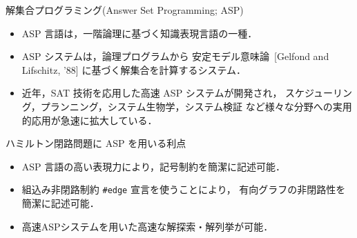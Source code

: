 \documentclass[dvipdfmx]{beamer}
\begin{document}
\begin{frame}{解集合プログラミング(Answer Set Programming; ASP)}

  \begin{itemize}
  \item \alert{ASP 言語}は，一階論理に基づく知識表現言語の一種．
  \item \alert{ASP システム}は，論理プログラムから
    安定モデル意味論~{\scriptsize[Gelfond and Lifschitz, '88]}
    に基づく解集合を計算するシステム．
  \item 近年，SAT 技術を応用した高速 ASP システムが開発され，
    スケジューリング，プランニング，システム生物学，システム検証
    など様々な分野への実用的応用が急速に拡大している．
  \end{itemize}

  \begin{alertblock}{ハミルトン閉路問題に ASP を用いる利点}
    \begin{itemize}
    \item ASP 言語の高い表現力により，記号制約を簡潔に記述可能．
    \item 組込み非閉路制約 \texttt{\#edge} 宣言を使うことにより，
      有向グラフの非閉路性を簡潔に記述可能．
    \item 高速ASPシステムを用いた高速な解探索・解列挙が可能．
    \end{itemize}
  \end{alertblock}
\end{frame}
\end{document}
